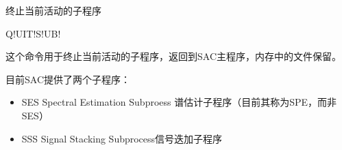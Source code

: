 \label{cmd:quitsub}

终止当前活动的子程序

\begin{SACSTX}
Q!UIT!S!UB!
\end{SACSTX}

这个命令用于终止当前活动的子程序，返回到SAC主程序，内存中的文件保留。

目前SAC提供了两个子程序：
\begin{itemize}
\item SES Spectral Estimation Subproess 谱估计子程序（目前其称为SPE，而非SES）
\item SSS Signal Stacking Subprocess信号迭加子程序
\end{itemize}
